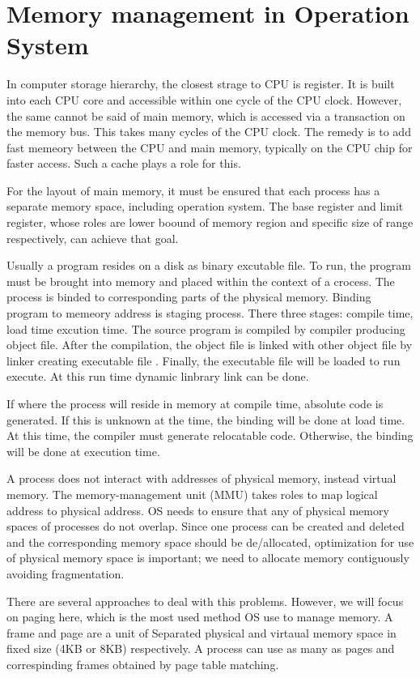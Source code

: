 \section{Memory management in Operation System}
\label{sec:history}
In computer storage hierarchy, the closest strage to CPU is register. It is built into each CPU core and accessible within one cycle of the CPU clock.
However, the same cannot be said of main memory, which is accessed via a transaction on the memory bus. This takes many cycles of the CPU clock.
The remedy is to add fast memeory between the CPU and main memory, typically on the CPU chip for faster access. Such a cache plays a role for this.

For the layout of main memory, it must be ensured that each process has a separate memory space, including operation system. 
The base register and limit register, whose roles are lower boound of memory region and specific size of range respectively, can achieve that goal. 

Usually a program resides on a disk as binary excutable file. To run, the program must be brought into memory and placed within the context of a crocess.
The process is binded to corresponding parts of the physical memory. Binding program to memeory address is staging process. 
There three stages: compile time, load time excution time. The source program is compiled by compiler producing object file. 
After the compilation, the object file is linked with other object file by linker creating executable file . 
Finally, the executable file will be loaded to run execute. At this run time dynamic linbrary link can be done.

If where the process will reside in memory at compile time, absolute code is generated. If this is unknown at the time, 
the binding will be done at load time. At this time, the compiler must generate relocatable code. Otherwise, the binding will be done at 
execution time.

A process does not interact with addresses of physical memory, instead virtual memory. The memory-management unit (MMU) takes roles to map 
logical address to physical address. OS needs to ensure that any of physical memory spaces of processes do not overlap. 
Since one process can be created and deleted and the corresponding memory space should be de/allocated, 
optimization for use of physical memory space is important; we need to allocate memory contiguously avoiding fragmentation.

There are several approaches to deal with this problems. However, we will focus on paging here, which is the most used method OS use to manage memory.
A frame and page are a unit of Separated physical and virtaual memory space in fixed size (4KB or 8KB) respectively.
A process can use as many as pages and correspinding frames obtained by page table matching.  
